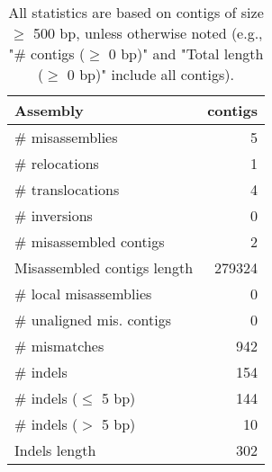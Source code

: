 \documentclass[12pt,a4paper]{article}
\begin{document}
\begin{table}[ht]
\begin{center}
\caption{All statistics are based on contigs of size $\geq$ 500 bp, unless otherwise noted (e.g., "\# contigs ($\geq$ 0 bp)" and "Total length ($\geq$ 0 bp)" include all contigs).}
\begin{tabular}{|l*{1}{|r}|}
\hline
Assembly & contigs \\ \hline
\# misassemblies & 5 \\ \hline
\hspace{5mm}\# relocations & 1 \\ \hline
\hspace{5mm}\# translocations & 4 \\ \hline
\hspace{5mm}\# inversions & 0 \\ \hline
\# misassembled contigs & 2 \\ \hline
Misassembled contigs length & 279324 \\ \hline
\# local misassemblies & 0 \\ \hline
\# unaligned mis. contigs & 0 \\ \hline
\# mismatches & 942 \\ \hline
\# indels & 154 \\ \hline
\hspace{5mm}\# indels ($\leq$ 5 bp) & 144 \\ \hline
\hspace{5mm}\# indels ($>$ 5 bp) & 10 \\ \hline
Indels length & 302 \\ \hline
\end{tabular}
\end{center}
\end{table}
\end{document}
